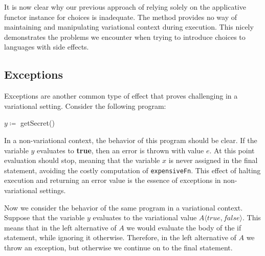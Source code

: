 \documentclass[letterpaper,10pt,onecolumn]{article}
\newcommand{\prog}[1]{{\small\texttt{#1}}}
\newcommand{\tagtree}[3]{#1 \langle #2, #3 \rangle}
\begin{document}
It is now clear why our previous approach of relying solely on the applicative functor instance for choices is inadequate. The method provides
no way of maintaining and manipulating variational context during execution. This nicely demonstrates the problems we encounter when
trying to introduce choices to languages with side effects.

%
%
%
% 

\subsection{Exceptions}

Exceptions are another common type of effect that proves challenging in a variational setting.
Consider the following program:

\begin{algorithmic}
\STATE $y \coloneqq$ getSecret()
\ENDIF
{}
\end{algorithmic}

In a non-variational context, the behavior of this program should be clear.
If the variable $y$ evaluates to \textbf{true}, then an error is thrown with value
$e$. At this point evaluation should stop, meaning that the variable $x$ is never
assigned in the final statement, avoiding the costly computation of \prog{expensiveFn}. This effect of halting execution and
returning an error value is the essence of exceptions in non-variational settings.

Now we consider the behavior of the same program in a variational context.
Suppose that the variable $y$ evaluates to the variational value
$\tagtree{A}{true}{false}$. This means that in the left alternative of $A$ we
would evaluate the body of the if statement, while ignoring it otherwise. Therefore,
in the left alternative of $A$ we throw an exception, but otherwise we continue on to the
final statement.
\end{document}

